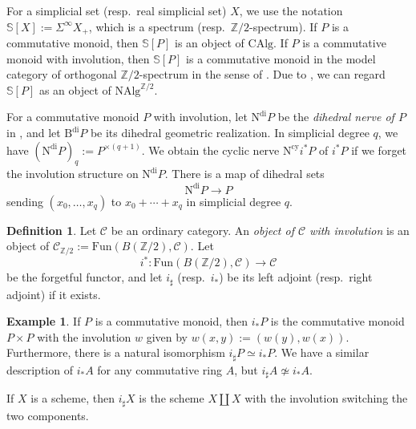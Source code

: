 \documentclass[10pt]{amsart}
\theoremstyle{definition}
\newtheorem{df}[thm]{Definition}
\newtheorem{exm}[thm]{Example}
\theoremstyle{remark}
\numberwithin{equation}{section}
\newcommand{\Sphere}{\mathbb{S}}
\newcommand{\cC}{\mathcal{C}}
\newcommand{\CAlg}{\mathrm{CAlg}}
\newcommand{\NAlg}{\mathrm{NAlg}}
\newcommand{\Fun}{\mathrm{Fun}}
\newcommand{\Bdi}{\mathrm{B}^{\mathrm{di}}}
\newcommand{\Ncy}{\mathrm{N}^\mathrm{cy}}
\newcommand{\Ndi}{\mathrm{N}^\mathrm{di}}
\newcommand{\Ztwo}{{\mathbb{Z}/2}}
\begin{document}
For a simplicial set (resp.\ real simplicial set) $X$,
we use the notation $\Sphere[X]:=\Sigma^\infty X_+$,
which is a spectrum (resp.\ $\Ztwo$-spectrum).
If $P$ is a commutative monoid,
then $\Sphere[P]$ is an object of $\CAlg$.
If $P$ is a commutative monoid with involution,
then $\Sphere[P]$ is a commutative monoid in the model category of orthogonal $\Ztwo$-spectrum in the sense of \cite[Definition A.2.2]{THR}.
Due to \cite[Remark A.2.6]{THR},
we can regard $\Sphere[P]$ as an object of $\NAlg^{\Ztwo}$.



For a commutative monoid $P$ with involution,
let $\Ndi P$ be the \emph{dihedral nerve of $P$} in \cite[Definition 4.2.2]{THR}, and let $\Bdi P$ be its dihedral geometric realization.
In simplicial degree $q$,
we have $(\Ndi P)_q:=P^{\times (q+1)}$.
We obtain the cyclic nerve $\Ncy i^* P$ \cite[\S 2.3]{zbMATH03671343} of $i^*P$ if we forget the involution structure on $\Ndi P$.
There is a map of dihedral sets
\begin{equation}
\label{drep.2.1}
\Ndi P
\to
P
\end{equation}
sending $(x_0,\ldots,x_q)$ to $x_0+\cdots+x_q$ in simplicial degree $q$.


\begin{df}
\label{thrlog.9}
Let $\cC$ be an ordinary category.
An \emph{object of $\cC$ with involution} is an object of $\cC_{\Ztwo}:=\Fun(B (\Ztwo),\cC)$.
Let
\[
i^*\colon \Fun(B (\Ztwo),\cC)
\to
\cC
\]
be the forgetful functor,
and let $i_\sharp$ (resp.\ $i_*$) be its left adjoint (resp.\ right adjoint) if it exists.
\end{df}

\begin{exm}
If $P$ is a commutative monoid,
then $i_*P$ is the commutative monoid $P\times P$ with the involution $w$ given by $w(x,y):=(w(y),w(x))$.
Furthermore,
there is a natural isomorphism $i_\sharp P\simeq i_*P$.
We have a similar description of $i_*A$ for any commutative ring $A$,
but $i_\sharp A \not\simeq i_*A$.

If $X$ is a scheme,
then $i_\sharp X$ is the scheme $X\amalg X$ with the involution switching the two components.
\end{exm}
\end{document}
